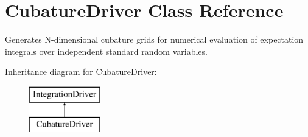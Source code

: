 \section{Cubature\+Driver Class Reference}
\label{classPecos_1_1CubatureDriver}


Generates N-\/dimensional cubature grids for numerical evaluation of expectation integrals over independent standard random variables.  


Inheritance diagram for Cubature\+Driver\+:\begin{figure}[H]
\begin{center}
\leavevmode
\includegraphics[height=2.000000cm]{classPecos_1_1CubatureDriver}
\end{center}
\end{figure}
